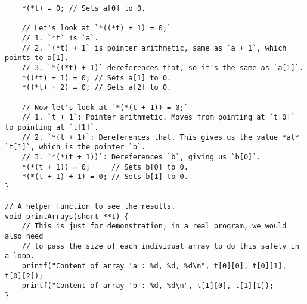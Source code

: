 \documentclass[11pt]{book}
\begin{document}
\begin{verbatim}
    *(*t) = 0; // Sets a[0] to 0.

    // Let's look at `*((*t) + 1) = 0;`
    // 1. `*t` is `a`.
    // 2. `(*t) + 1` is pointer arithmetic, same as `a + 1`, which points to a[1].
    // 3. `*((*t) + 1)` dereferences that, so it's the same as `a[1]`.
    *((*t) + 1) = 0; // Sets a[1] to 0.
    *((*t) + 2) = 0; // Sets a[2] to 0.

    // Now let's look at `*(*(t + 1)) = 0;`
    // 1. `t + 1`: Pointer arithmetic. Moves from pointing at `t[0]` to pointing at `t[1]`.
    // 2. `*(t + 1)`: Dereferences that. This gives us the value *at* `t[1]`, which is the pointer `b`.
    // 3. `*(*(t + 1))`: Dereferences `b`, giving us `b[0]`.
    *(*(t + 1)) = 0;     // Sets b[0] to 0.
    *(*(t + 1) + 1) = 0; // Sets b[1] to 0.
}

// A helper function to see the results.
void printArrays(short **t) {
    // This is just for demonstration; in a real program, we would also need
    // to pass the size of each individual array to do this safely in a loop.
    printf("Content of array 'a': %d, %d, %d\n", t[0][0], t[0][1], t[0][2]);
    printf("Content of array 'b': %d, %d\n", t[1][0], t[1][1]);
}

\end{verbatim}
\end{document}
